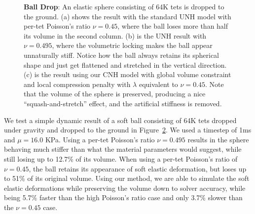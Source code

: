 \begin{figure}
\begin{subfigure}{.16\linewidth}
		\label{sfig:ball-vc-6}
	\end{subfigure}\hfill
	\begin{subfigure}{.03\linewidth}
	\end{subfigure}%
	\begin{subfigure}{.16\linewidth}
	\end{subfigure}%
	\begin{subfigure}{.16\linewidth}
	\end{subfigure}%
	\begin{subfigure}{.16\linewidth}
	\end{subfigure}%
	\begin{subfigure}{.16\linewidth}
	\end{subfigure}%
	\begin{subfigure}{.16\linewidth}
	\end{subfigure}%
	\begin{subfigure}{.16\linewidth}
	\end{subfigure}%
	\caption{\textbf{Ball Drop}: An elastic sphere consisting of 64K tets is dropped to the ground. (a) shows the result with the standard UNH model with per-tet Poisson's ratio $\nu = 0.45$, where the ball loses more than half its volume in the second column. (b) is the UNH result with $\nu = 0.495$, where the volumetric locking makes the ball appear unnaturally stiff. Notice how the ball always retains its spherical shape and just get flattened and stretched in the vertical direction. (c) is the result using our CNH model with global volume constraint and local compression penalty with $\lambda$ equivalent to $\nu = 0.45$. Note that the volume of the sphere is preserved, producing a nice ``squash-and-stretch'' effect, and the artificial stiffness is removed.} \label{fig:fine-ball}
\end{figure}

We test a simple dynamic result of a soft ball consisting of 64K tets dropped under gravity and dropped to the ground in Figure~\ref{fig:fine-ball}. We used a timestep of 1ms and $\mu = 16.0$ KPa. Using a per-tet Poisson's ratio $\nu = 0.495$ results in the sphere behaving much stiffer than what the material parameters would suggest, while still losing up to 12.7\% of its volume. When using a per-tet Poisson's ratio of $\nu = 0.45$, the ball retains its appearance of soft elastic deformation, but loses up to 51\% of its original volume. Using our method, we are able to simulate the soft elastic deformations while preserving the volume down to solver accuracy, while being 5.7\% faster than the high Poisson's ratio case and only 3.7\% slower than the $\nu=0.45$ case. 


